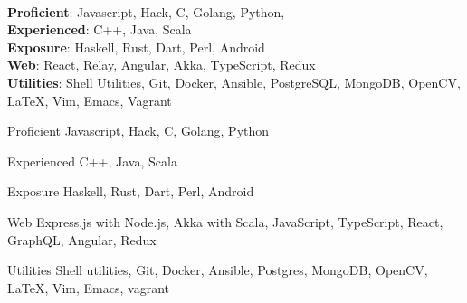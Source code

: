 \ifdefined\ONEPAGE
\\
\textbf{Proficient}: Javascript, Hack, C, Golang, Python, \\\vspace{0.3mm}
\textbf{Experienced}: C++, Java, Scala\\\vspace{0.3mm}
\textbf{Exposure}: Haskell, Rust, Dart, Perl, Android\\\vspace{0.3mm}
\textbf{Web}: React, Relay, Angular, Akka, TypeScript, Redux\\\vspace{0.3mm}
\textbf{Utilities}: Shell Utilities, Git, Docker, Ansible, PostgreSQL, MongoDB, OpenCV,
\LaTeX, Vim, Emacs, Vagrant

\else
\begin{cvskills}

  \cvskill
  {Proficient}
  {Javascript, Hack, C, Golang, Python}

  \cvskill
  {Experienced}
  {C++, Java, Scala}

  \cvskill
  {Exposure}
  {Haskell, Rust, Dart, Perl, Android}

  \cvskill
  {Web}
  {Express.js with Node.js, Akka with Scala, JavaScript, TypeScript, React, GraphQL, Angular, Redux}

  \cvskill
  {Utilities}
  {Shell utilities, Git, Docker, Ansible, Postgres,
    MongoDB, OpenCV, \LaTeX, Vim, Emacs, vagrant}

\end{cvskills}
\fi
